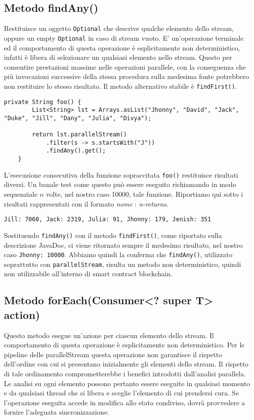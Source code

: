 		\subsection{Metodo findAny()}
			Restituisce un oggetto \lstinline|Optional| che descrive qualche elemento dello stream, oppure un empty \lstinline|Optional| in caso di stream vuoto. E' un'operazione terminale ed il comportamento di questa operazione è esplicitamente non deterministico, infatti è libera di selezionare un qualsiasi elemento nello stream. Questo per consentire prestazioni massime nelle operazioni parallele, con la conseguenza che più invocazioni successive della stessa procedura sulla medesima fonte potrebbero non restituire lo stesso risultato. Il metodo alternativo stabile è \lstinline|findFirst()|.
			\begin{lstlisting}[breaklines=true]
	private String foo() {
		List<String> lst = Arrays.asList("Jhonny", "David", "Jack", "Duke", "Jill", "Dany", "Julia", "Divya");
		
		return lst.parallelStream()
			.filter(s -> s.startsWith("J"))
			.findAny().get();
	}
			\end{lstlisting}
			L'esecuzione consecutiva della funzione sopraccitata \lstinline|foo()| restituisce risultati diversi. Un banale test come questo può essere eseguito richiamando in modo sequenziale $n$ volte, nel nostro caso 10000, tale funzione. Riportiamo qui sotto i risultati rappresentati con il formato \textit{nome} : \textit{n-returns}.
			\begin{lstlisting}[numbers=none,frame=none]
	Jill: 7060, Jack: 2319, Julia: 91, Jhonny: 179, Jenish: 351
			\end{lstlisting}
			Sostituendo \lstinline|findAny()| con il metodo \lstinline|findFirst()|, come riportato sulla descrizione JavaDoc, ci viene ritornato sempre il medesimo risultato, nel nostro caso \lstinline|Jhonny: 10000|.
			Abbiamo quindi la conferma che \lstinline|findAny()|, utilizzato soprattutto con \lstinline|parallelStream|, risulta un metodo non deterministico, quindi non utilizzabile all'interno di smart contract blockchain.
			
		\subsection{Metodo forEach(Consumer<? super T> action)}
		\label{subsection-forEach}
			Questo metodo esegue un'azione per ciascun elemento dello stream. Il comportamento di questa operazione è esplicitamente non deterministico.
			Per le pipeline delle parallelStream  questa operazione non garantisce il rispetto dell'ordine con cui si presentano inizialmente gli elementi dello stream. Il rispetto di tale ordinamento comprometterebbe i benefici introdotti dall'analisi parallela. Le analisi su ogni elemento possono pertanto essere eseguite in qualsiasi momento e da qualsiasi thread che si libera e sceglie l'elemento di cui prendersi cura. Se l'operazione eseguita accede in modifica allo stato condiviso, dovrà provvedere a fornire l'adeguata sincronizzazione. 
			
